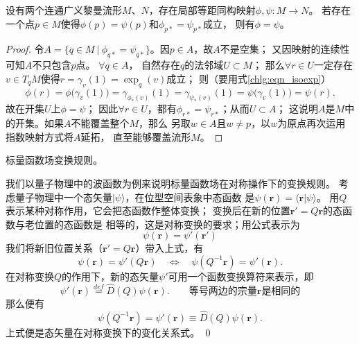 \begin{proposition}\label{chlg:thm_isopall}
    设有两个连通广义黎曼流形$M$、$N$，存在局部等距同构映射$\phi,\psi:M\to N$。
    若存在一个点$p\in M$使得$\phi(p)=\psi(p)$和$\phi_{p*} = \psi_{p*}$成立，
    则有$\phi=\psi$。
\end{proposition}
\begin{proof}
    令$A=\{ q\in M \ | \  \phi_{q*} = \psi_{q*}\}$。因$p\in A$，故$A$不是空集；
    又因映射的连续性可知$A$不只包含$p$点。    $\forall q\in A$，
    自然存在$q$的法邻域$U\subset M$；
    那么$\forall r\in U$一定存在$v\in T_q M$使得$r=\gamma_v(1)=\exp_q(v)$成立；
    则（要用式\eqref{chlg:eqn_isoexp}）
    \begin{equation}
        \phi(r) = \phi \bigl(\gamma_v(1)\bigr)= \gamma_{\phi_*(v)} (1)
        = \gamma_{\psi_*(v)} (1) =\psi \bigl(\gamma_v(1)\bigr) =\psi(r).
    \end{equation}
    故在开集$U$上$\phi=\psi$；
    因此$\forall r\in U$，都有$\phi_{r*} = \psi_{r*}$；从而$U\subset A$；
    这说明$A$是$M$中的开集。如果$A$不能覆盖整个$M$，那么
    另取$w\in A$且$w\neq p$，以$w$为原点再次运用指数映射方式将$A$延拓，
    直至能够覆盖流形$M$。
\end{proof}

\begin{example}\label{chlg:exam_DQpsi}
    标量函数场变换规则。
\end{example}      
我们以量子物理中的波函数为例来说明标量函数场在对称操作下的变换规则。
考虑量子物理中一个态矢量$|\psi\rangle$，在位型空间表象中态函数
是$\psi(\boldsymbol{r}) = \langle \boldsymbol{r}|\psi\rangle$。
用$Q$表示某种对称作用，它会把态函数作整体变换；
变换后在新的位置$\boldsymbol{r}'=Q \boldsymbol{r}$的态函数与老位置的态函数是
相等的，这是对称变换的要求；用公式表示为
\begin{equation}
    \psi(\boldsymbol{r}) = \psi'(\boldsymbol{r}')
\end{equation}
我们将新旧位置关系（$\boldsymbol{r}'=Q \boldsymbol{r}$）带入上式，有
\begin{equation}
    \psi(\boldsymbol{r}) = \psi'(Q \boldsymbol{r}) \quad \Leftrightarrow \quad
    \psi(Q^{-1}\boldsymbol{r}) = \psi'(\boldsymbol{r}) .
\end{equation}
在对称变换$Q$的作用下，新的态矢量$\psi'$可用一个函数变换算符来表示，即
\begin{equation}\label{chlg:eqn_psip2psi}
    \psi'(\boldsymbol{r}) \overset{def}{=}\hat{D}(Q)\psi(\boldsymbol{r}).
    \qquad \text{等号两边的宗量$\boldsymbol{r}$是相同的}
\end{equation}
那么便有
\begin{equation}\label{chlg:eqn_DQpsi}
    \psi(Q^{-1}\boldsymbol{r})  = \psi'(\boldsymbol{r}) \equiv \hat{D}(Q)\psi(\boldsymbol{r}) .
\end{equation}
上式便是态矢量在对称变换下的变化关系式。    \qed


